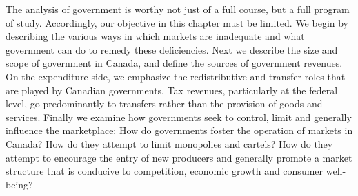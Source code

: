 The analysis of government is worthy not just of a full course, but a full program of study. Accordingly, our objective in this chapter must be limited. We begin by describing the various ways in which markets are inadequate and what government can do to remedy these deficiencies. Next we describe the size and scope of government in Canada, and define the sources of government revenues. On the expenditure side, we emphasize the redistributive and transfer roles that are played by Canadian governments. Tax revenues, particularly at the federal level, go predominantly to transfers rather than the provision of goods and services. Finally we examine how governments seek to control, limit and generally influence the marketplace: How do governments foster the operation of markets in Canada? How do they attempt to limit monopolies and cartels? How do they attempt to encourage the entry of new producers and generally promote a market structure that is conducive to competition, economic growth and consumer well-being?